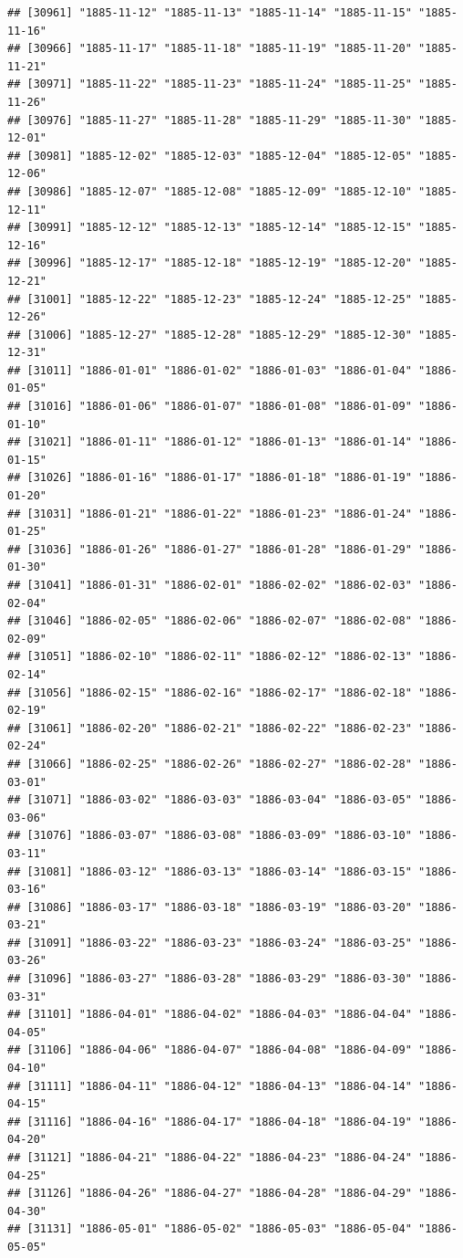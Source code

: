 \documentclass{article}\usepackage[]{graphicx}\usepackage[]{color}
\makeatletter
\newenvironment{kframe}{%
 \def\at@end@of@kframe{}%
 \ifinner\ifhmode%
  \def\at@end@of@kframe{\end{minipage}}%
  \begin{minipage}{\columnwidth}%
 \fi\fi%
 \def\FrameCommand##1{\hskip\@totalleftmargin \hskip-\fboxsep
 \colorbox{shadecolor}{##1}\hskip-\fboxsep
     \hskip-\linewidth \hskip-\@totalleftmargin \hskip\columnwidth}%
 \MakeFramed {\advance\hsize-\width
   \@totalleftmargin\z@ \linewidth\hsize
   \@setminipage}}%
 {\par\unskip\endMakeFramed%
 \at@end@of@kframe}
\newenvironment{knitrout}{}{} %
\makeatother
\begin{document}
\begin{description}
\begin{knitrout}
\begin{kframe}
\begin{verbatim}
## [30961] "1885-11-12" "1885-11-13" "1885-11-14" "1885-11-15" "1885-11-16"
## [30966] "1885-11-17" "1885-11-18" "1885-11-19" "1885-11-20" "1885-11-21"
## [30971] "1885-11-22" "1885-11-23" "1885-11-24" "1885-11-25" "1885-11-26"
## [30976] "1885-11-27" "1885-11-28" "1885-11-29" "1885-11-30" "1885-12-01"
## [30981] "1885-12-02" "1885-12-03" "1885-12-04" "1885-12-05" "1885-12-06"
## [30986] "1885-12-07" "1885-12-08" "1885-12-09" "1885-12-10" "1885-12-11"
## [30991] "1885-12-12" "1885-12-13" "1885-12-14" "1885-12-15" "1885-12-16"
## [30996] "1885-12-17" "1885-12-18" "1885-12-19" "1885-12-20" "1885-12-21"
## [31001] "1885-12-22" "1885-12-23" "1885-12-24" "1885-12-25" "1885-12-26"
## [31006] "1885-12-27" "1885-12-28" "1885-12-29" "1885-12-30" "1885-12-31"
## [31011] "1886-01-01" "1886-01-02" "1886-01-03" "1886-01-04" "1886-01-05"
## [31016] "1886-01-06" "1886-01-07" "1886-01-08" "1886-01-09" "1886-01-10"
## [31021] "1886-01-11" "1886-01-12" "1886-01-13" "1886-01-14" "1886-01-15"
## [31026] "1886-01-16" "1886-01-17" "1886-01-18" "1886-01-19" "1886-01-20"
## [31031] "1886-01-21" "1886-01-22" "1886-01-23" "1886-01-24" "1886-01-25"
## [31036] "1886-01-26" "1886-01-27" "1886-01-28" "1886-01-29" "1886-01-30"
## [31041] "1886-01-31" "1886-02-01" "1886-02-02" "1886-02-03" "1886-02-04"
## [31046] "1886-02-05" "1886-02-06" "1886-02-07" "1886-02-08" "1886-02-09"
## [31051] "1886-02-10" "1886-02-11" "1886-02-12" "1886-02-13" "1886-02-14"
## [31056] "1886-02-15" "1886-02-16" "1886-02-17" "1886-02-18" "1886-02-19"
## [31061] "1886-02-20" "1886-02-21" "1886-02-22" "1886-02-23" "1886-02-24"
## [31066] "1886-02-25" "1886-02-26" "1886-02-27" "1886-02-28" "1886-03-01"
## [31071] "1886-03-02" "1886-03-03" "1886-03-04" "1886-03-05" "1886-03-06"
## [31076] "1886-03-07" "1886-03-08" "1886-03-09" "1886-03-10" "1886-03-11"
## [31081] "1886-03-12" "1886-03-13" "1886-03-14" "1886-03-15" "1886-03-16"
## [31086] "1886-03-17" "1886-03-18" "1886-03-19" "1886-03-20" "1886-03-21"
## [31091] "1886-03-22" "1886-03-23" "1886-03-24" "1886-03-25" "1886-03-26"
## [31096] "1886-03-27" "1886-03-28" "1886-03-29" "1886-03-30" "1886-03-31"
## [31101] "1886-04-01" "1886-04-02" "1886-04-03" "1886-04-04" "1886-04-05"
## [31106] "1886-04-06" "1886-04-07" "1886-04-08" "1886-04-09" "1886-04-10"
## [31111] "1886-04-11" "1886-04-12" "1886-04-13" "1886-04-14" "1886-04-15"
## [31116] "1886-04-16" "1886-04-17" "1886-04-18" "1886-04-19" "1886-04-20"
## [31121] "1886-04-21" "1886-04-22" "1886-04-23" "1886-04-24" "1886-04-25"
## [31126] "1886-04-26" "1886-04-27" "1886-04-28" "1886-04-29" "1886-04-30"
## [31131] "1886-05-01" "1886-05-02" "1886-05-03" "1886-05-04" "1886-05-05"

\end{verbatim}
\end{kframe}
\end{knitrout}
\end{description}
\end{document}
